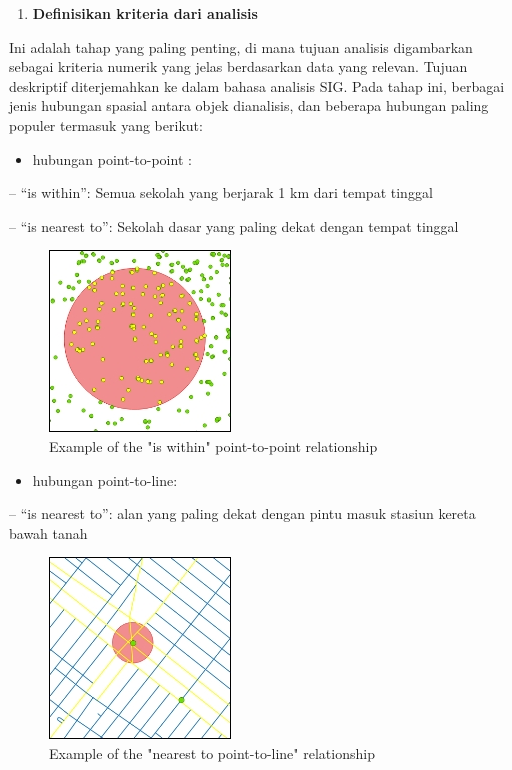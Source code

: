 \documentclass[]{book}
\providecommand{\tightlist}{%
  \setlength{\itemsep}{0pt}\setlength{\parskip}{0pt}}
\begin{document}
\begin{enumerate}
\def\labelenumi{\arabic{enumi}.}
\setcounter{enumi}{2}
\tightlist
\item
  \textbf{Definisikan kriteria dari analisis}
\end{enumerate}

Ini adalah tahap yang paling penting, di mana tujuan analisis digambarkan sebagai kriteria numerik yang jelas berdasarkan data yang relevan. Tujuan deskriptif diterjemahkan ke dalam bahasa analisis SIG. Pada tahap ini, berbagai jenis hubungan spasial antara objek dianalisis, dan beberapa hubungan paling populer termasuk yang berikut:

\newpage

\begin{itemize}
\tightlist
\item
  hubungan point-to-point :
\end{itemize}

-- ``is within'': Semua sekolah yang berjarak 1 km dari tempat tinggal

-- ``is nearest to'': Sekolah dasar yang paling dekat dengan tempat tinggal

\begin{figure}

{\centering \includegraphics[width=0.2\linewidth]{images/04/fig1} 

}

\caption{Example of the "is within" point-to-point relationship}\label{fig:fig1401}
\end{figure}

\begin{itemize}
\tightlist
\item
  hubungan point-to-line:
\end{itemize}

-- ``is nearest to'': alan yang paling dekat dengan pintu masuk stasiun kereta bawah tanah

\begin{figure}

{\centering \includegraphics[width=0.2\linewidth]{images/04/fig2} 

}

\caption{Example of the "nearest to point-to-line" relationship}\label{fig:fig1402}
\end{figure}
\end{document}
